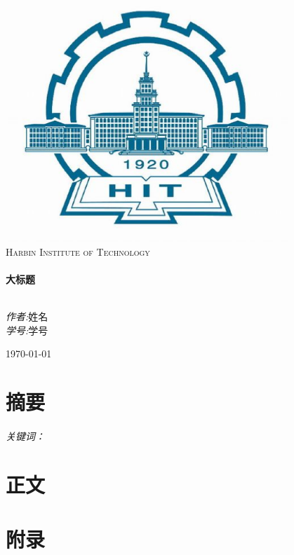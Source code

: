 \documentclass[a4paper,11pt]{ctexart}
\begin{document}
\begin{titlepage}
\begin{center}

\includegraphics[width=0.8\textwidth]{./images/HIT.eps}\\[1cm]
\textsc{\LARGE Harbin Institute of Technology}\\[1.5cm]

\hrulefill \\[0.4cm]
{ \huge \bfseries 大标题}\\[0.4cm]
\hrulefill \\[1.5cm]

\begin{minipage}{0.4\textwidth}
\begin{flushleft} \large
\end{flushleft}
\end{minipage}

\begin{minipage}{\textwidth}
\begin{flushright} \large
\emph{作者:}姓名\\
\emph{学号:}学号
\end{flushright}
\end{minipage}

\vfill
{\large \today}%
\end{center}
\end{titlepage}

\part*{摘要}
\paragraph{关键词：}

\tableofcontents            %
\newpage

\part{正文}

\newpage
\appendix
\part{附录}
\end{document}
